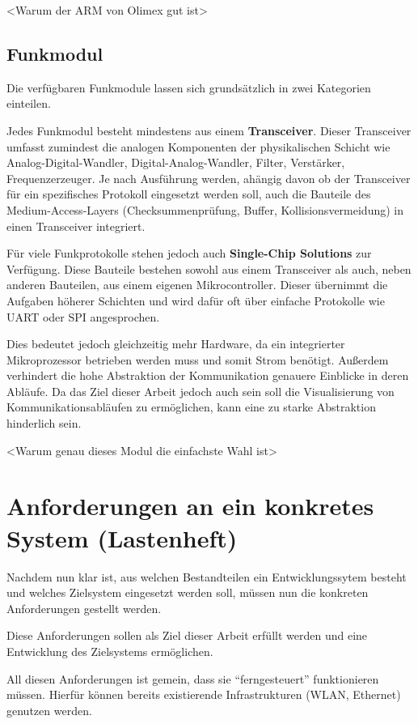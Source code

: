  <Warum der ARM von Olimex gut ist>

\subsection{Funkmodul} Die verfügbaren Funkmodule lassen sich grundsätzlich in
zwei Kategorien einteilen.

Jedes Funkmodul besteht mindestens aus einem \textbf{Transceiver}. Dieser
Transceiver umfasst zumindest die analogen Komponenten der physikalischen
Schicht wie Analog-Digital-Wandler, Digital-Analog-Wandler, Filter, Verstärker,
Frequenzerzeuger. Je nach Ausführung werden, ahängig davon ob der Transceiver
für ein spezifisches Protokoll eingesetzt werden soll, auch die Bauteile des
Medium-Access-Layers (Checksummenprüfung, Buffer, Kollisionsvermeidung) in
einen Transceiver integriert.

Für viele Funkprotokolle stehen jedoch auch \textbf{Single-Chip Solutions}
zur Verfügung. Diese Bauteile bestehen sowohl aus einem Transceiver als auch,
neben anderen Bauteilen, aus einem eigenen Mikrocontroller. Dieser übernimmt die
Aufgaben höherer Schichten und wird dafür oft über einfache Protokolle wie UART
oder SPI angesprochen.

Dies bedeutet jedoch gleichzeitig mehr Hardware, da ein integrierter
Mikroprozessor betrieben werden muss und somit Strom benötigt.
Außerdem verhindert die hohe Abstraktion der Kommunikation genauere Einblicke in
deren Abläufe. Da das Ziel dieser Arbeit jedoch auch sein soll die
Visualisierung von Kommunikationsabläufen zu ermöglichen, kann eine zu starke
Abstraktion hinderlich sein.


 <Warum genau dieses Modul die einfachste Wahl ist>
\section{Anforderungen an ein konkretes System (Lastenheft)}
Nachdem nun klar ist, aus welchen Bestandteilen ein Entwicklungssytem besteht
und welches Zielsystem eingesetzt werden soll, müssen nun die
konkreten Anforderungen gestellt werden.

Diese Anforderungen sollen als Ziel dieser Arbeit erfüllt werden und eine
Entwicklung des Zielsystems ermöglichen.

All diesen Anforderungen ist gemein, dass sie "`ferngesteuert"' funktionieren
müssen. Hierfür können bereits existierende Infrastrukturen (WLAN,
Ethernet) genutzen werden.

